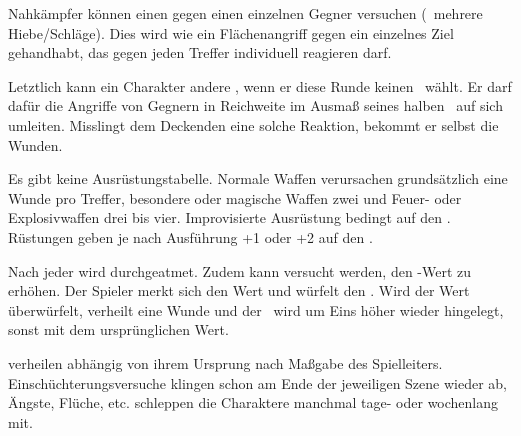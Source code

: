 {		Nahkämpfer können einen  gegen einen einzelnen Gegner versuchen (\zB\ mehrere Hiebe/Schläge). Dies wird wie ein Flächenangriff gegen ein einzelnes Ziel gehandhabt, das gegen jeden Treffer individuell reagieren darf.

		Letztlich kann ein Charakter andere , wenn er diese Runde keinen \AD\ wählt. Er darf dafür die Angriffe von Gegnern in Reichweite im Ausmaß seines halben \RD\ auf sich umleiten. Misslingt dem Deckenden eine solche Reaktion, bekommt er selbst die Wunden.


		\noindent
		Es gibt keine Ausrüstungstabelle. Normale Waffen verursachen grundsätzlich eine Wunde pro Treffer, besondere oder magische Waffen zwei und Feuer- oder Explosivwaffen drei bis vier. Improvisierte Ausrüstung bedingt  auf den \AD. Rüstungen geben je nach Ausführung +1 oder +2 auf den \RD.


		\noindent
		Nach jeder  wird durchgeatmet. Zudem kann versucht werden, den \HD-Wert zu erhöhen. Der Spieler merkt sich den Wert und würfelt den \HD. Wird der Wert überwürfelt, verheilt eine Wunde und der \HD\ wird um Eins höher wieder hingelegt, sonst mit dem ursprünglichen Wert.

		 verheilen abhängig von ihrem Ursprung nach Maßgabe des Spielleiters. Einschüchterungsversuche klingen schon am Ende der jeweiligen Szene wieder ab, Ängste, Flüche, etc. schleppen die Charaktere manchmal tage- oder wochenlang mit.
}

